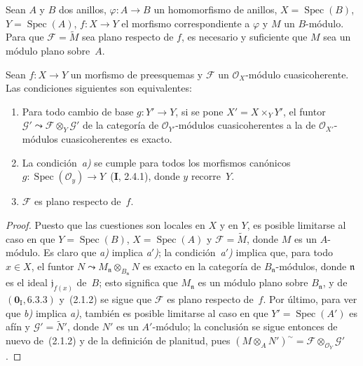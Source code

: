 \begin{proposition}[2.1.2]
\label{IV.2.1.2-fr}
Sean $A$ y $B$ dos anillos, $\varphi:A\to B$ un homomorfismo de anillos, $X=\operatorname{Spec}(B)$, $Y=\operatorname{Spec}(A)$, $f:X\to Y$ el morfismo correspondiente a $\varphi$ y $M$ un $B$-módulo.
Para que $\mathscr F=\widetilde M$ sea plano respecto de $f$, es necesario y suficiente que $M$ sea un módulo plano sobre~$A$.
\end{proposition}


\begin{proposition}[2.1.3]
\label{IV.2.1.3-fr}
Sean $f:X\to Y$ un morfismo de preesquemas y $\mathscr F$ un $\mathcal O_X$-módulo cuasicoherente. Las condiciones siguientes son equivalentes:
\begin{enumerate}
  \item[\emph{a)}] Para todo cambio de base $g:Y'\to Y$, si se pone $X'=X\times_Y Y'$, el funtor $\mathscr G'\leadsto\mathscr F\otimes_Y\mathscr G'$ de la categoría de $\mathcal O_{Y'}$-módulos cuasicoherentes a la de $\mathcal O_{X'}$-módulos cuasicoherentes es exacto.
  \item[\emph{a$'$)}] La condición~\emph{a)} se cumple para todos los morfismos canónicos $g:\operatorname{Spec}(\mathcal O_y)\to Y$~\textup{(\textbf{I}, 2.4.1)}, donde $y$ recorre~$Y$.
  \item[\emph{b)}] $\mathscr F$ es plano respecto de~$f$.
\end{enumerate}
\end{proposition}

\begin{proof}
Puesto que las cuestiones son locales en $X$ y en $Y$, es posible limitarse al caso en que $Y=\operatorname{Spec}(B)$, $X=\operatorname{Spec}(A)$ y $\mathscr F=\widetilde M$, donde $M$ es un $A$-módulo.
Es claro que \emph{a)} implica \emph{a$'$)};
la condición~\emph{a$'$)} implica que, para todo $x\in X$, el funtor $N\leadsto M_{\mathfrak n}\otimes_{B_{\mathfrak n}}N$ es exacto en la categoría de $B_{\mathfrak n}$-módulos, donde $\mathfrak n$ es el ideal $\mathfrak j_{f(x)}$ de~$B$; esto significa que $M_{\mathfrak n}$ es un módulo plano sobre $B_{\mathfrak n}$, y de~$(\mathbf{0}_{\mathrm I},6.3.3)$ y~(2.1.2) se sigue que $\mathscr F$ es plano respecto de~$f$.
Por último, para ver que \emph{b)} implica \emph{a)}, también es posible limitarse al caso en que $Y'=\operatorname{Spec}(A')$ es afín y $\mathscr G'=\widetilde{N}'$, donde $N'$ es un $A'$-módulo; la conclusión se sigue entonces de nuevo de~(2.1.2) y de la definición de planitud, pues $(M\otimes_A N')^{\sim}=\mathscr F\otimes_{\mathcal O_Y}\mathscr G'$.
\end{proof}
